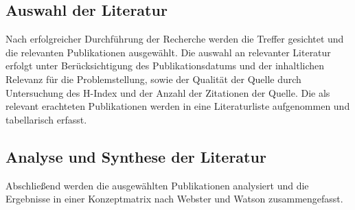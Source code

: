 \documentclass[11pt]{article}
\begin{document}
\subsection{Auswahl der Literatur}
Nach erfolgreicher Durchführung der Recherche werden die Treffer gesichtet und die relevanten Publikationen ausgewählt.
Die auswahl an relevanter Literatur erfolgt unter Berücksichtigung des Publikationsdatums und der inhaltlichen Relevanz für die Problemstellung, sowie der Qualität der Quelle durch Untersuchung des H-Index und der Anzahl der Zitationen der Quelle.
Die als relevant erachteten Publikationen werden in eine Literaturliste aufgenommen und tabellarisch erfasst.

\subsection{Analyse und Synthese der Literatur}
Abschließend werden die ausgewählten Publikationen analysiert und die Ergebnisse in einer Konzeptmatrix nach Webster und Watson zusammengefasst.
\end{document}
